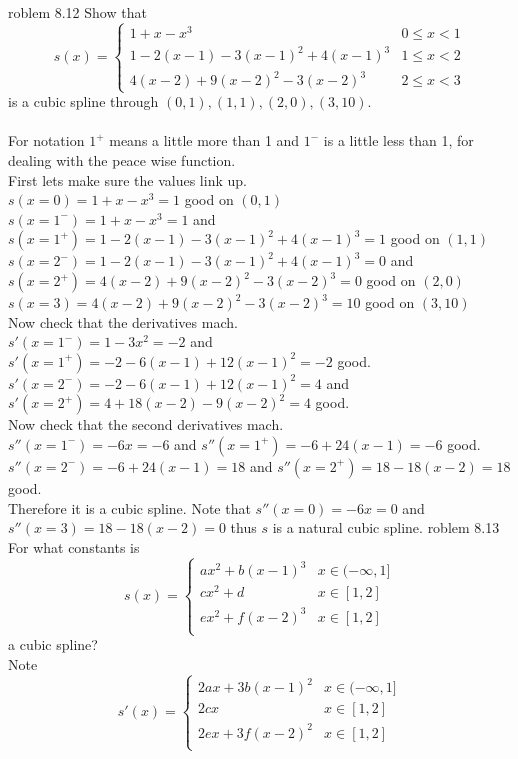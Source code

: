 \documentclass[12pt]{article}
\makeatletter
\theoremstyle{homework}
\newenvironment{exercise}[1]
{\def\@currentlabel{#1}\exercisecore}
{\endexercisecore}
\makeatother
\begin{document}
\begin{exercise}

Problem 8.12
\end{exercise}
Show that $$s(x)=\begin{cases}
1+x-x^3 & 0\leq x<1\\
1-2(x-1)-3(x-1)^2+4(x-1)^3 & 1\leq x<2\\
4(x-2)+9(x-2)^2-3(x-2)^3 & 2\leq x<3
\end{cases}$$
is a cubic spline through $(0,1),(1,1),(2,0),(3,10)$.\\\\
For notation $1^+$ means a little more than 1 and $1^-$ is a little less than 1, for dealing with the peace wise function.\\
First lets make sure the values link up.\\
$s(x=0)=1+x-x^3=1$ good on $(0,1)$\\
$s(x=1^-)=1+x-x^3=1$ and $s(x=1^+)=1-2(x-1)-3(x-1)^2+4(x-1)^3=1$ good on $(1,1)$\\
$s(x=2^-)=1-2(x-1)-3(x-1)^2+4(x-1)^3=0$ and $s(x=2^+)=4(x-2)+9(x-2)^2-3(x-2)^3=0$ good on $(2,0)$\\
$s(x=3)=4(x-2)+9(x-2)^2-3(x-2)^3=10$ good on $(3,10)$\\
Now check that the derivatives mach.\\
$s'(x=1^-)=1-3x^2=-2$ and $s'(x=1^+)=-2-6(x-1)+12(x-1)^2=-2$ good.\\
$s'(x=2^-)=-2-6(x-1)+12(x-1)^2=4$ and $s'(x=2^+)=4+18(x-2)-9(x-2)^2=4$ good.\\
Now check that the second derivatives mach.\\
$s''(x=1^-)=-6x=-6$ and $s''(x=1^+)=-6+24(x-1)=-6$ good.\\
$s''(x=2^-)=-6+24(x-1)=18$ and $s''(x=2^+)=18-18(x-2)=18$ good.\\
Therefore it is a cubic spline.
Note that $s''(x=0)=-6x=0$ and $s''(x=3)=18-18(x-2)=0$ thus $s$ is a natural cubic spline.
\begin{exercise}

Problem 8.13
\end{exercise}
For what constants is
$$s(x)=\begin{cases}
ax^2+b(x-1)^3 & x\in(-\infty,1]\\
cx^2+d & x\in[1,2]\\
ex^2+f(x-2)^3 & x\in[1,2]\\
\end{cases}$$
a cubic spline?\\
Note
$$s'(x)=\begin{cases}
2ax+3b(x-1)^2 & x\in(-\infty,1]\\
2cx & x\in[1,2]\\
2ex+3f(x-2)^2 & x\in[1,2]\\
\end{cases}$$
\end{document}
